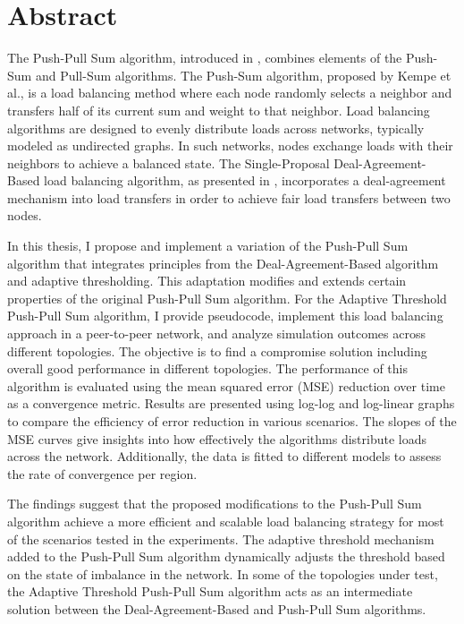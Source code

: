 \chapter*{Abstract}

The Push-Pull Sum algorithm, introduced in \cite{nugroho2023PushPullSumDataAg}, combines elements of the Push-Sum \cite{kempe2003gossipbasedComp} and Pull-Sum algorithms. The Push-Sum algorithm, proposed by Kempe et al., is a load balancing method where each node randomly selects a neighbor and transfers half of its current sum and weight to that neighbor. Load balancing algorithms are designed to evenly distribute loads across networks, typically modeled as undirected graphs. In such networks, nodes exchange loads with their neighbors to achieve a balanced state. The Single-Proposal Deal-Agreement-Based load balancing algorithm, as presented in \cite{Dinitz2023DAB}, incorporates a deal-agreement mechanism into load transfers in order to achieve fair load transfers between two nodes.

In this thesis, I propose and implement a variation of the Push-Pull Sum algorithm that integrates principles from the Deal-Agreement-Based algorithm and adaptive thresholding. This adaptation modifies and extends certain properties of the original Push-Pull Sum algorithm. For the Adaptive Threshold Push-Pull Sum algorithm, I provide pseudocode, implement this load balancing approach in a peer-to-peer network, and analyze simulation outcomes across different topologies. The objective is to find a compromise solution including overall good performance in different topologies. The performance of this algorithm is evaluated using the mean squared error (MSE) reduction over time as a convergence metric. Results are presented using log-log and log-linear graphs to compare the efficiency of error reduction in various scenarios. The slopes of the MSE curves give insights into how effectively the algorithms distribute loads across the network. Additionally, the data is fitted to different models to assess the rate of convergence per region.

The findings suggest that the proposed modifications to the Push-Pull Sum algorithm achieve a more efficient and scalable load balancing strategy for most of the scenarios tested in the experiments. The adaptive threshold mechanism added to the Push-Pull Sum algorithm dynamically adjusts the threshold based on the state of imbalance in the network. In some of the topologies under test, the Adaptive Threshold Push-Pull Sum algorithm acts as an intermediate solution between the Deal-Agreement-Based and Push-Pull Sum algorithms.